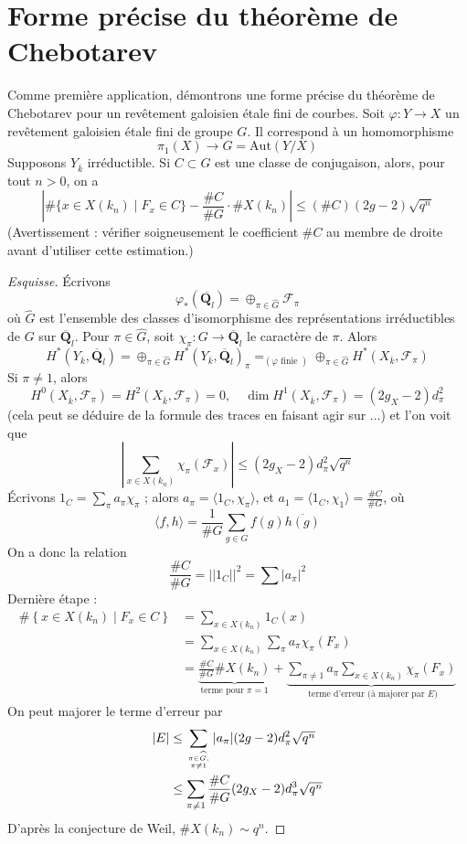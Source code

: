 \section{Forme précise du théorème de Chebotarev}
\label{section-chebotarev}

\noindent
Comme première application, démontrons une forme précise du théorème de Chebotarev
pour un revêtement galoisien étale fini de courbes.
Soit $\varphi : Y \to X$ un revêtement galoisien étale fini de
groupe $G$. Il correspond à un homomorphisme
$$
\pi_1(X) \longrightarrow G = \text{Aut}(Y/X)
$$
Supposons $Y_{\overline{k}}$ irréductible. Si $C\subset G$ est une classe de conjugaison,
alors, pour tout $n > 0$, on a
$$
| \# \{x \in X(k_n) \mid F_x \in C\} - \frac{\# C}{\# G} \cdot \# X(k_n) |
\leq
(\# C)(2g - 2) \sqrt{q^n}
$$
(Avertissement : vérifier soigneusement le coefficient $\# C$ au membre de droite
avant d'utiliser cette estimation.)

\begin{proof}[Esquisse]
Écrivons
$$
\varphi_*(\overline{\mathbf{Q}_l}) =
\oplus_{\pi \in \widehat{G}} \mathcal{F}_{\pi}
$$
où $\widehat{G}$ est l'ensemble des classes d'isomorphisme
des représentations irréductibles de
$G$ sur $\overline{\mathbf{Q}}_l$. Pour $\pi \in \widehat{G}$,
soit $\chi_{\pi}: G \to \overline{\mathbf{Q}}_l$
le caractère de $\pi$. Alors
$$
H^*(Y_{\overline{k}}, \overline{\mathbf{Q}}_l) =
\oplus_{\pi\in \widehat{G}}
H^*(Y_{\overline{k}}, \overline{\mathbf{Q}}_l)_\pi
=_{(\varphi\text{ finie })}
\oplus_{\pi\in \widehat{G}}
H^*(X_{\overline{k}}, \mathcal{F}_\pi)
$$
Si $\pi\neq 1$, alors
$$
H^0(X_{\overline{k}}, \mathcal{F}_\pi) =
H^2(X_{\overline{k}}, \mathcal{F}_\pi) = 0,\quad
\dim H^1(X_{\overline{k}}, \mathcal{F}_\pi) = (2g_X - 2)d_\pi^2
$$
(cela peut se déduire de la formule des traces en faisant agir sur ...) et l'on voit que
$$
|\sum_{x \in X(k_n)} \chi_\pi(\mathcal{F}_x)| \leq
(2g_X - 2) d_\pi^2\sqrt{q^n}
$$
Écrivons $1_C = \sum_\pi a_\pi \chi_\pi$ ; alors
$a_\pi = \langle 1_C, \chi_\pi\rangle$, et
$a_1 = \langle 1_C, \chi_1\rangle = \frac{\# C}{\# G}$, où
$$
\langle f, h\rangle = \frac{1}{\# G}\sum_{g \in G} f(g)\overline{h(g)}
$$
On a donc la relation
$$
\frac{\# C}{\# G} = ||1_C||^2 = \sum|a_\pi|^2
$$
Dernière étape :
\begin{align*}
\#\left\{x \in X(k_n) \mid F_x \in C\right\}
& =
\sum_{x \in X(k_n)} 1_C(x) \\
& =
\sum_{x \in X(k_n)} \sum_\pi a_\pi \chi_\pi(F_x) \\
& =
\underbrace{\frac{\# C}{\# G} \# X(k_n)}_{
\text{terme pour }\pi = 1}
+
\underbrace{\sum_{\pi\neq 1}a_\pi\sum_{x\in X(k_n)}\chi_\pi(F_x)}_{
\text{ terme d'erreur (à majorer par }E)}
\end{align*}
On peut majorer le terme d'erreur par
\begin{align*}
|E|
& \leq
\sum_{\pi \in \widehat{G}, \atop \pi \neq 1}
|a_\pi| (2g - 2) d_\pi^2 \sqrt{q^n} \\
& \leq
\sum_{\pi \neq 1} \frac{\# C}{\# G} (2g_X - 2) d_\pi^3 \sqrt{q^n}
\end{align*}
D'après la conjecture de Weil, $\# X(k_n)\sim q^n$.
\end{proof}



